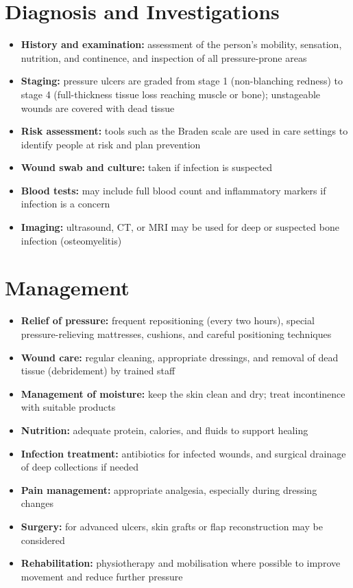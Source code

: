 \section*{Diagnosis and Investigations}
\begin{itemize}
    \item \textbf{History and examination:} assessment of the person's mobility, sensation, nutrition, and continence, and inspection of all pressure-prone areas
    \item \textbf{Staging:} pressure ulcers are graded from stage 1 (non-blanching redness) to stage 4 (full-thickness tissue loss reaching muscle or bone); unstageable wounds are covered with dead tissue
    \item \textbf{Risk assessment:} tools such as the Braden scale are used in care settings to identify people at risk and plan prevention
    \item \textbf{Wound swab and culture:} taken if infection is suspected
    \item \textbf{Blood tests:} may include full blood count and inflammatory markers if infection is a concern
    \item \textbf{Imaging:} ultrasound, CT, or MRI may be used for deep or suspected bone infection (osteomyelitis)
\end{itemize}

\section*{Management}
\begin{itemize}
    \item \textbf{Relief of pressure:} frequent repositioning (every two hours), special pressure-relieving mattresses, cushions, and careful positioning techniques
    \item \textbf{Wound care:} regular cleaning, appropriate dressings, and removal of dead tissue (debridement) by trained staff
    \item \textbf{Management of moisture:} keep the skin clean and dry; treat incontinence with suitable products
    \item \textbf{Nutrition:} adequate protein, calories, and fluids to support healing
    \item \textbf{Infection treatment:} antibiotics for infected wounds, and surgical drainage of deep collections if needed
    \item \textbf{Pain management:} appropriate analgesia, especially during dressing changes
    \item \textbf{Surgery:} for advanced ulcers, skin grafts or flap reconstruction may be considered
    \item \textbf{Rehabilitation:} physiotherapy and mobilisation where possible to improve movement and reduce further pressure
\end{itemize}

